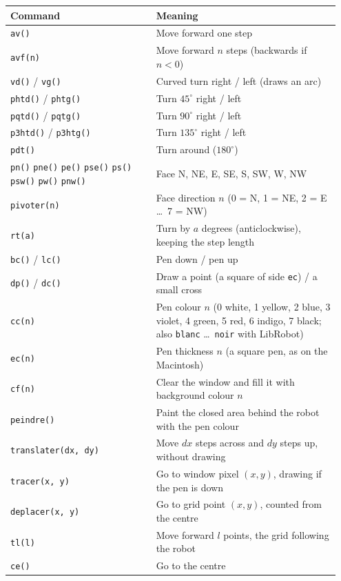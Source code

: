 \documentclass[11pt,a4paper]{article}
\newcommand{\kbd}[1]{\texttt{#1}}
\begin{document}
\begin{longtable}{@{}p{0.42\linewidth} p{0.53\linewidth}@{}}
\toprule
\textbf{Command} & \textbf{Meaning} \\
\midrule
\endhead
\bottomrule
\endfoot
\kbd{av()} & Move forward one step \\
\kbd{avf(n)} & Move forward $n$ steps (backwards if $n < 0$) \\
\kbd{vd()} / \kbd{vg()} & Curved turn right / left (draws an arc) \\
\kbd{phtd()} / \kbd{phtg()} & Turn $45^\circ$ right / left \\
\kbd{pqtd()} / \kbd{pqtg()} & Turn $90^\circ$ right / left \\
\kbd{p3htd()} / \kbd{p3htg()} & Turn $135^\circ$ right / left \\
\kbd{pdt()} & Turn around ($180^\circ$) \\
\kbd{pn()} \kbd{pne()} \kbd{pe()} \kbd{pse()} \kbd{ps()} \kbd{psw()} \kbd{pw()} \kbd{pnw()} & Face N, NE, E, SE, S, SW, W, NW \\
\kbd{pivoter(n)} & Face direction $n$ (0 = N, 1 = NE, 2 = E \dots\ 7 = NW) \\
\kbd{rt(a)} & Turn by $a$ degrees (anticlockwise), keeping the step length \\
\kbd{bc()} / \kbd{lc()} & Pen down / pen up \\
\kbd{dp()} / \kbd{dc()} & Draw a point (a square of side \kbd{ec}) / a small cross \\
\kbd{cc(n)} & Pen colour $n$ (0 white, 1 yellow, 2 blue, 3 violet, 4 green, 5 red, 6 indigo, 7 black; also \kbd{blanc} \dots\ \kbd{noir} with LibRobot) \\
\kbd{ec(n)} & Pen thickness $n$ (a square pen, as on the Macintosh) \\
\kbd{cf(n)} & Clear the window and fill it with background colour $n$ \\
\kbd{peindre()} & Paint the closed area behind the robot with the pen colour \\
\kbd{translater(dx, dy)} & Move $dx$ steps across and $dy$ steps up, without drawing \\
\kbd{tracer(x, y)} & Go to window pixel $(x, y)$, drawing if the pen is down \\
\kbd{deplacer(x, y)} & Go to grid point $(x, y)$, counted from the centre \\
\kbd{tl(l)} & Move forward $l$ points, the grid following the robot \\
\kbd{ce()} & Go to the centre \\

\end{longtable}
\end{document}
